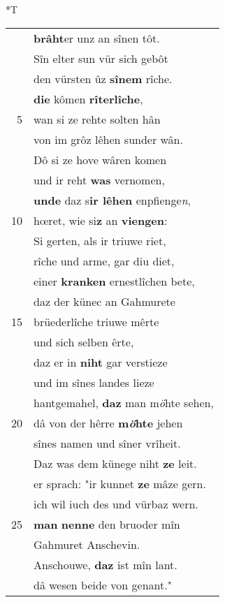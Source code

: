 \documentclass[8pt,a4paper,notitlepage]{article}
\begin{document}
\begin{table}[ht]
\begin{minipage}[t]{0.5\linewidth}
\end{minipage}
\hspace{0.5cm}
\begin{minipage}[t]{0.5\linewidth}
\small
\begin{center}*T
\end{center}
\begin{tabular}{rl}
 & \textbf{brâht}er unz an sînen tôt.\\ 
 & Sîn elter sun vür sich gebôt\\ 
 & den vürsten ûz \textbf{sînem} rîche.\\ 
 & \textbf{die} kômen \textbf{rîterlîche},\\ 
5 & wan si ze rehte solten hân\\ 
 & von im grôz lêhen sunder wân.\\ 
 & Dô si ze hove wâren komen\\ 
 & und ir reht \textbf{was} vernomen,\\ 
 & \textbf{unde} daz s\textbf{ir lêhen} enpfienge\textit{n},\\ 
10 & hœret, wie si\textbf{z} an \textbf{viengen}:\\ 
 & Si gerten, als ir triuwe riet,\\ 
 & rîche und arme, gar diu diet,\\ 
 & einer \textbf{kranken} ernestlîchen bete,\\ 
 & daz der künec an Gahmurete\\ 
15 & brüederlîche triuwe mêrte\\ 
 & und sich selben êrte,\\ 
 & daz er in \textbf{niht} gar verstieze\\ 
 & und im sînes landes lieze\\ 
 & hantgemahel, \textbf{daz} man m\textit{ö}hte sehen,\\ 
20 & dâ von der hêrre \textbf{m\textit{ö}hte} jehen\\ 
 & sînes namen und sîner vrîheit.\\ 
 & Daz was dem künege niht \textbf{ze} leit.\\ 
 & er sprach: "ir kunnet \textbf{ze} mâze gern.\\ 
 & ich wil iuch des und vürbaz wern.\\ 
25 & \textbf{man} \textbf{nenne} den bruoder mîn\\ 
 & Gahmuret Anschevin.\\ 
 & Anschouwe, \textbf{daz} ist mîn lant.\\ 
 & dâ wesen beide von genant."\\ 

\end{tabular}
\end{minipage}
\end{table}
\end{document}
